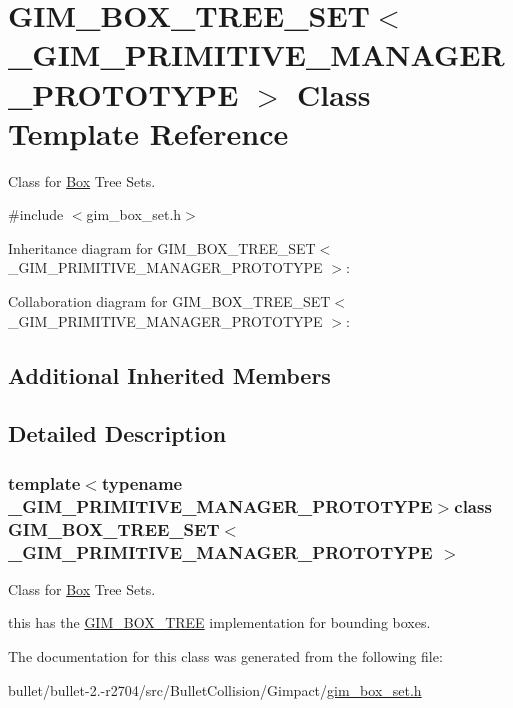 \hypertarget{class_g_i_m___b_o_x___t_r_e_e___s_e_t}{\section{G\+I\+M\+\_\+\+B\+O\+X\+\_\+\+T\+R\+E\+E\+\_\+\+S\+E\+T$<$ \+\_\+\+G\+I\+M\+\_\+\+P\+R\+I\+M\+I\+T\+I\+V\+E\+\_\+\+M\+A\+N\+A\+G\+E\+R\+\_\+\+P\+R\+O\+T\+O\+T\+Y\+P\+E $>$ Class Template Reference}
\label{class_g_i_m___b_o_x___t_r_e_e___s_e_t}
}


Class for \hyperlink{class_box}{Box} Tree Sets.  




{\ttfamily \#include $<$gim\+\_\+box\+\_\+set.\+h$>$}



Inheritance diagram for G\+I\+M\+\_\+\+B\+O\+X\+\_\+\+T\+R\+E\+E\+\_\+\+S\+E\+T$<$ \+\_\+\+G\+I\+M\+\_\+\+P\+R\+I\+M\+I\+T\+I\+V\+E\+\_\+\+M\+A\+N\+A\+G\+E\+R\+\_\+\+P\+R\+O\+T\+O\+T\+Y\+P\+E $>$\+:


Collaboration diagram for G\+I\+M\+\_\+\+B\+O\+X\+\_\+\+T\+R\+E\+E\+\_\+\+S\+E\+T$<$ \+\_\+\+G\+I\+M\+\_\+\+P\+R\+I\+M\+I\+T\+I\+V\+E\+\_\+\+M\+A\+N\+A\+G\+E\+R\+\_\+\+P\+R\+O\+T\+O\+T\+Y\+P\+E $>$\+:
\subsection*{Additional Inherited Members}


\subsection{Detailed Description}
\subsubsection*{template$<$typename \+\_\+\+G\+I\+M\+\_\+\+P\+R\+I\+M\+I\+T\+I\+V\+E\+\_\+\+M\+A\+N\+A\+G\+E\+R\+\_\+\+P\+R\+O\+T\+O\+T\+Y\+P\+E$>$class G\+I\+M\+\_\+\+B\+O\+X\+\_\+\+T\+R\+E\+E\+\_\+\+S\+E\+T$<$ \+\_\+\+G\+I\+M\+\_\+\+P\+R\+I\+M\+I\+T\+I\+V\+E\+\_\+\+M\+A\+N\+A\+G\+E\+R\+\_\+\+P\+R\+O\+T\+O\+T\+Y\+P\+E $>$}

Class for \hyperlink{class_box}{Box} Tree Sets. 

this has the \hyperlink{class_g_i_m___b_o_x___t_r_e_e}{G\+I\+M\+\_\+\+B\+O\+X\+\_\+\+T\+R\+E\+E} implementation for bounding boxes. 

The documentation for this class was generated from the following file\+:\begin{DoxyCompactItemize}
\item 
bullet/bullet-\/2.-\/r2704/src/\+Bullet\+Collision/\+Gimpact/\hyperlink{gim__box__set_8h}{gim\+\_\+box\+\_\+set.\+h}\end{DoxyCompactItemize}
